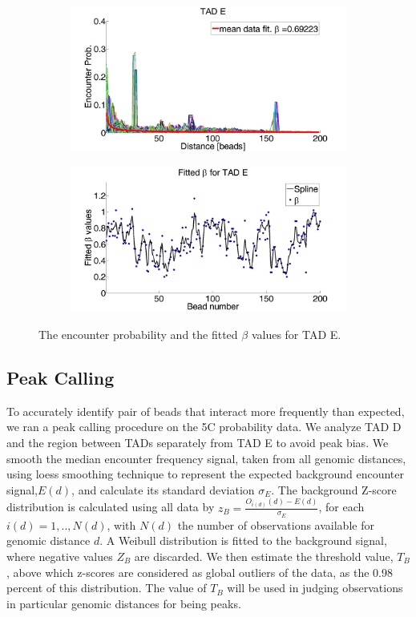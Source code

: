 \documentclass[12pt]{article}
\begin{document}
\begin{figure}[H]
 \begin{subfigure}[b]{0.3\textwidth}
 \includegraphics[scale=0.2]{meanDataFitTADE}
 \caption{}
 \end{subfigure}
 
 \begin{subfigure}[b]{0.3\textwidth}
\includegraphics[scale=0.2]{fittedExpValuesWithSplineAverageTADE}
\caption{}
 \end{subfigure}
\caption{The encounter probability and the fitted $\beta$ values for TAD E.}
\end{figure}
\subsection{Peak Calling}

To accurately identify pair of beads that interact more frequently than expected, we ran a peak calling procedure on the 5C probability data. We analyze TAD D and the region between TADs separately from TAD E to avoid peak bias. We smooth the median encounter frequency signal, taken from all genomic distances, using loess smoothing technique to represent the expected background encounter signal,$E(d)$, and calculate its standard deviation $\sigma_E$. The background Z-score distribution is calculated using all data by $z_B=\frac{O_{i(d)}(d)-E(d)}{\sigma_E}$, for each $i(d)=1,..,N(d)$, with $N(d)$ the number of observations available for genomic distance $d$. A Weibull distribution is fitted to the background signal, where negative values $Z_B$ are discarded. We then estimate the threshold value, $T_B$, above which z-scores are considered as global outliers of the data, as the 0.98 percent of this distribution. The value of $T_B$ will be used in judging observations in particular genomic distances for being peaks.
\end{document}
